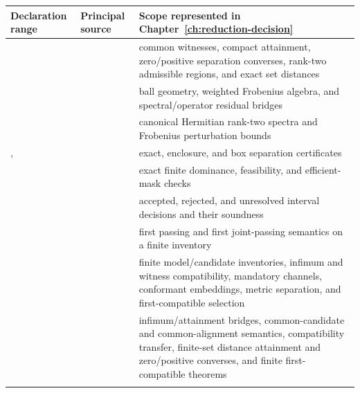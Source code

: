 \begin{table}[ht]
\centering
\small
\begin{tabularx}{\textwidth}{@{}Z Y Y@{}}
\toprule
Declaration range & Principal source & Scope represented in Chapter~\ref{ch:reduction-decision} \\
\midrule
{}
  & 
  & common witnesses, compact attainment, zero/positive separation converses, rank-two
    admissible regions, and exact set distances \\
  & 
  & ball geometry, weighted Frobenius algebra, and spectral/operator residual bridges \\
  & 
  & canonical Hermitian rank-two spectra and Frobenius perturbation bounds \\
, 
  & 
  & exact, enclosure, and box separation certificates \\
  & 
  & exact finite dominance, feasibility, and efficient-mask checks \\
  & 
  & accepted, rejected, and unresolved interval decisions and their soundness \\
  & 
  & first passing and first joint-passing semantics on a finite inventory \\
  & 
  & finite model/candidate inventories, infimum and witness compatibility, mandatory
    channels, conformant embeddings, metric separation, and first-compatible selection \\
  & 
  & infimum/attainment bridges, common-candidate and common-alignment semantics,
    compatibility transfer, finite-set distance attainment and zero/positive converses,
    and finite first-compatible theorems \\
  & 

\end{tabularx}
\end{table}
